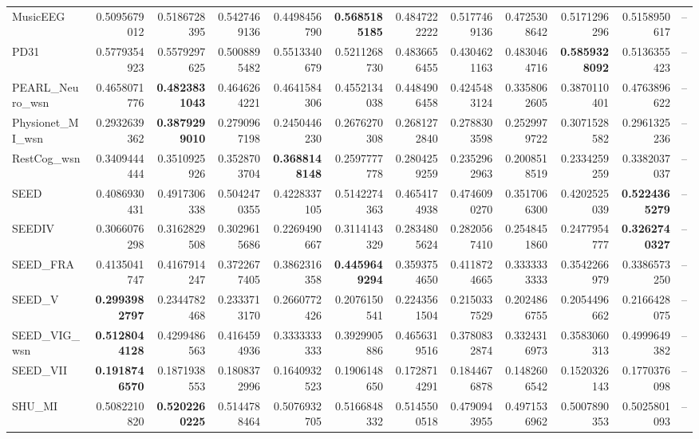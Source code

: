 \begin{table}[htbp]
\begin{tabular}{lrrrrrrrrrrr}
MusicEEG & 0.5095679012 & 0.5186728395 & 0.5427469136 & 0.4498456790 & \bfseries 0.5685185185 & 0.4847222222 & 0.5177469136 & 0.4725308642 & 0.5171296296 & 0.5158950617 & -- \\
PD31 & 0.5779354923 & 0.5579297625 & 0.5008895482 & 0.5513340679 & 0.5211268730 & 0.4836656455 & 0.4304621163 & 0.4830464716 & \bfseries 0.5859328092 & 0.5136355423 & -- \\
PEARL_Neuro_wsn & 0.4658071776 & \bfseries 0.4823831043 & 0.4646264221 & 0.4641584306 & 0.4552134038 & 0.4484906458 & 0.4245483124 & 0.3358062605 & 0.3870110401 & 0.4763896622 & -- \\
Physionet_MI_wsn & 0.2932639362 & \bfseries 0.3879299010 & 0.2790967198 & 0.2450446230 & 0.2676270308 & 0.2681272840 & 0.2788303598 & 0.2529979722 & 0.3071528582 & 0.2961325236 & -- \\
RestCog_wsn & 0.3409444444 & 0.3510925926 & 0.3528703704 & \bfseries 0.3688148148 & 0.2597777778 & 0.2804259259 & 0.2352962963 & 0.2008518519 & 0.2334259259 & 0.3382037037 & -- \\
SEED & 0.4086930431 & 0.4917306338 & 0.5042470355 & 0.4228337105 & 0.5142274363 & 0.4654174938 & 0.4746090270 & 0.3517066300 & 0.4202525039 & \bfseries 0.5224365279 & -- \\
SEEDIV & 0.3066076298 & 0.3162829508 & 0.3029615686 & 0.2269490667 & 0.3114143329 & 0.2834805624 & 0.2820567410 & 0.2548451860 & 0.2477954777 & \bfseries 0.3262740327 & -- \\
SEED_FRA & 0.4135041747 & 0.4167914247 & 0.3722677405 & 0.3862316358 & \bfseries 0.4459649294 & 0.3593754650 & 0.4118724665 & 0.3333333333 & 0.3542266979 & 0.3386573250 & -- \\
SEED_V & \bfseries 0.2993982797 & 0.2344782468 & 0.2333713170 & 0.2660772426 & 0.2076150541 & 0.2243561504 & 0.2150337529 & 0.2024866755 & 0.2054496662 & 0.2166428075 & -- \\
SEED_VIG_wsn & \bfseries 0.5128044128 & 0.4299486563 & 0.4164594936 & 0.3333333333 & 0.3929905886 & 0.4656319516 & 0.3780832874 & 0.3324316973 & 0.3583060313 & 0.4999649382 & -- \\
SEED_VII & \bfseries 0.1918746570 & 0.1871938553 & 0.1808372996 & 0.1640932523 & 0.1906148650 & 0.1728714291 & 0.1844676878 & 0.1482606542 & 0.1520326143 & 0.1770376098 & -- \\
SHU_MI & 0.5082210820 & \bfseries 0.5202260225 & 0.5144788464 & 0.5076932705 & 0.5166848332 & 0.5145500518 & 0.4790943955 & 0.4971536962 & 0.5007890353 & 0.5025801093 & -- \\

\end{tabular}
\end{table}
